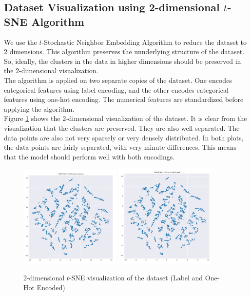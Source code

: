 \documentclass[12pt]{article}
\begin{document}
    \subsection*{Dataset Visualization using 2-dimensional $t$-SNE Algorithm}
    We use the $t$-Stochastic Neighbor Embedding Algorithm to reduce the dataset to 2 dimensions. This algorithm preserves the unnderlying
    structure of the dataset. So, ideally, the clusters in the data in higher dimensions should be preserved in the 2-dimensional visualization.
    \vspace*{5pt} \\
    The algorithm is applied on two separate copies of the dataset. One encodes categorical features using label encoding, and the other
    encodes categorical features using one-hot encoding. The numerical features are standardized before applying the algorithm.
    \vspace*{5pt} \\
    Figure \ref{fig:tsne} shows the 2-dimensional visualization of the dataset. It is clear from the visualization that the clusters are preserved.
    They are also well-separated. The data points are also not very sparsely or very densely distributed.
    In both plots, the data points are fairly separated, with very minute differences. This means that the model should perform
    well with both encodings.

    \begin{figure}[ht]
        \centering
        \includegraphics[width=0.45\textwidth]{./../Assets/tsne_1.png}
        \hfill
        \includegraphics[width=0.45\textwidth]{./../Assets/tsne_2.png}
        \caption{2-dimensional $t$-SNE visualization of the dataset (Label and One-Hot Encoded)}
        \label{fig:tsne}
    \end{figure}
\end{document}
